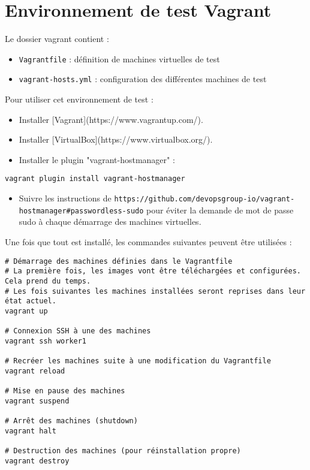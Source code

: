 \documentclass[a4paper,oneside,10pt]{article}
\begin{document}
\section{Environnement de test Vagrant}

Le dossier vagrant contient :
\begin{itemize}
	\item  \verb!Vagrantfile! : définition de machines virtuelles de test
	\item  \verb!vagrant-hosts.yml! : configuration des différentes machines de test
\end{itemize}

Pour utiliser cet environnement de test :

\begin{itemize}
\item Installer [Vagrant](https://www.vagrantup.com/).
\item Installer [VirtualBox](https://www.virtualbox.org/).
\item Installer le plugin "vagrant-hostmanager" :
\end{itemize}

\begin{verbatim}
vagrant plugin install vagrant-hostmanager
\end{verbatim}

\begin{itemize}
\item Suivre les instructions de \texttt{https://github.com/devopsgroup-io/vagrant-hostmanager\#passwordless-sudo} pour éviter la demande de mot de passe sudo à chaque démarrage des machines virtuelles.
\end{itemize}
Une fois que tout est installé, les commandes suivantes peuvent être utilisées :

\begin{verbatim}
# Démarrage des machines définies dans le Vagrantfile
# La première fois, les images vont être téléchargées et configurées. Cela prend du temps.
# Les fois suivantes les machines installées seront reprises dans leur état actuel.
vagrant up

# Connexion SSH à une des machines
vagrant ssh worker1

# Recréer les machines suite à une modification du Vagrantfile
vagrant reload

# Mise en pause des machines
vagrant suspend

# Arrêt des machines (shutdown)
vagrant halt

# Destruction des machines (pour réinstallation propre)
vagrant destroy
\end{verbatim}
\end{document}
